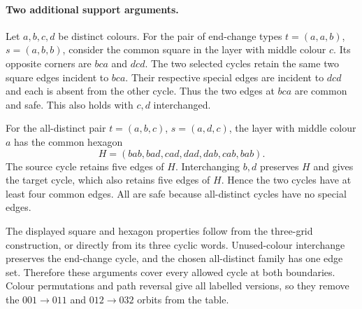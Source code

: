 \paragraph{Two additional support arguments.}
Let $a,b,c,d$ be distinct colours. For the pair of end-change types
$t=(a,a,b)$, $s=(a,b,b)$, consider the common square in the layer
with middle colour $c$. Its opposite corners are $bca$ and $dcd$.
The two selected cycles retain the same two square edges incident
to $bca$. Their respective special edges are incident to $dcd$
and each is absent from the other cycle. Thus the two edges at
$bca$ are common and safe. This also holds with $c,d$ interchanged.

For the all-distinct pair $t=(a,b,c)$, $s=(a,d,c)$, the layer with
middle colour $a$ has the common hexagon
\[
H=(bab,bad,cad,dad,dab,cab,bab).
\]
The source cycle retains five edges of $H$. Interchanging $b,d$
preserves $H$ and gives the target cycle, which also retains five
edges of $H$. Hence the two cycles have at least four common edges.
All are safe because all-distinct cycles have no special edges.

The displayed square and hexagon properties follow from the
three-grid construction, or directly from its three cyclic words.
Unused-colour interchange preserves the end-change cycle, and the
chosen all-distinct family has one edge set. Therefore these
arguments cover every allowed cycle at both boundaries. Colour
permutations and path reversal give all labelled versions, so they
remove the $001\to011$ and $012\to032$ orbits from the table.


